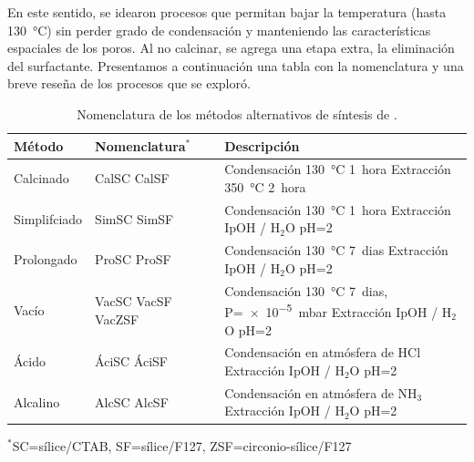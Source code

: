 	 En este sentido, se idearon procesos que permitan bajar la temperatura (hasta \SI{130}{\celsius}) sin perder grado de condensación y manteniendo las características espaciales de los poros. Al no calcinar, se agrega una etapa extra, la eliminación del surfactante. Presentamos a continuación una tabla con la nomenclatura y una breve reseña de los procesos que se exploró.

	 	 \begin{table}[ht!] 
		 	 \caption[Tratamientos alternativos de síntesis de \pdm]{Nomenclatura de los métodos alternativos de síntesis de \pdm.}
			 \begin{tabular}{>{\raggedright\arraybackslash}m{1.9cm}>{\centering\arraybackslash}m{1cm}>{\raggedright\arraybackslash}m{0.9cm}>{\raggedright\arraybackslash}m{6.62cm}} 
			 \toprule
				 Método   &  Nomenclatura$^*$&  & Descripción \\ \midrule
				 Calcinado & CalSC CalSF& &  Condensación \SI{130}{\celsius} \SI{1}{hora}\hspace{2cm} Extracción \SI{350}{\celsius} \SI{2}{hora}\hspace{2cm} \\ \midrule
				 Simplifciado & SimSC SimSF& &  Condensación \SI{130}{\celsius} \SI{1}{hora}\hspace{2cm} Extracción IpOH / H$_2$O pH=2 \\ \midrule
				 Prolongado & ProSC ProSF& & Condensación \SI{130}{\celsius} \SI{7}{dias}\hspace{2cm} Extracción IpOH / H$_2$O pH=2 \\ \midrule				
				 Vacío & VacSC VacSF VacZSF& &  Condensación \SI{130}{\celsius} \SI{7}{dias}, P=\SI{e-5}{\milli\bar}\hspace{2cm} Extracción IpOH / H$_2$O pH=2 \\ \midrule
				 Ácido & ÁciSC ÁciSF& &  Condensación en atmósfera de HCl\hspace{2cm} Extracción IpOH / H$_2$O pH=2 \\ \midrule
				 Alcalino & AlcSC AlcSF& & Condensación en atmósfera de NH$_3$\hspace{2cm} Extracción IpOH / H$_2$O pH=2 \\ 
				\bottomrule
				   \end{tabular}\vspace*{2pt}
		    	  	\footnotesize{$^*$SC=sílice/CTAB, SF=sílice/F127, ZSF=circonio-sílice/F127}
				   	\label{tabla:tratamientos}
				   \end{table}
				   \vspace*{-0.22cm}

